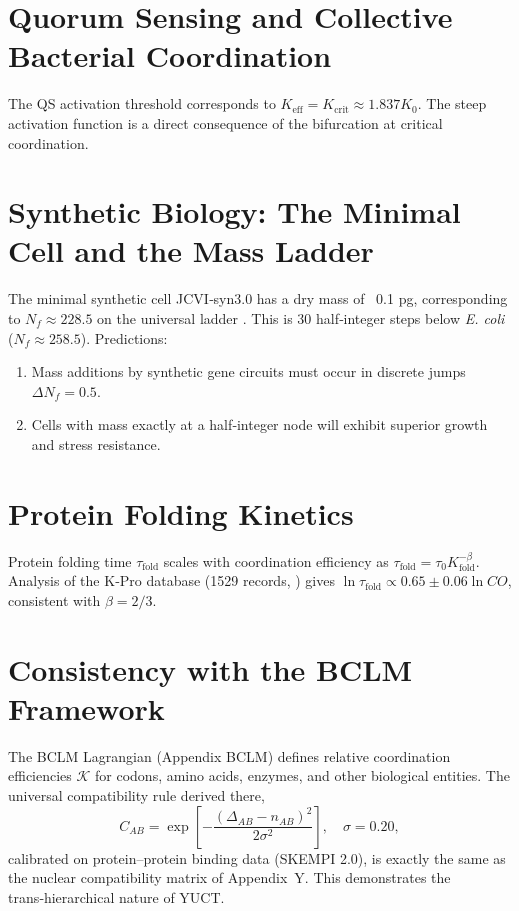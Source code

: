 \documentclass[11pt,a4paper]{article}
\newcommand{\REL}{\mathcal{K}}
\begin{document}
	\section{Quorum Sensing and Collective Bacterial Coordination}
	
	The QS activation threshold corresponds to \(K_{\text{eff}} = K_{\mathrm{crit}} \approx 1.837 K_0\). The steep activation function is a direct consequence of the bifurcation at critical coordination.
	
	\section{Synthetic Biology: The Minimal Cell and the Mass Ladder}
	
	The minimal synthetic cell JCVI‑syn3.0 has a dry mass of ~0.1 pg, corresponding to \(N_f \approx 228.5\) on the universal ladder \cite{Hutchison2016, Pelletier2023}. This is 30 half‑integer steps below \textit{E. coli} (\(N_f \approx 258.5\)). Predictions:
	\begin{enumerate}
		\item Mass additions by synthetic gene circuits must occur in discrete jumps \(\Delta N_f = 0.5\).
		\item Cells with mass exactly at a half‑integer node will exhibit superior growth and stress resistance.
	\end{enumerate}
	
	\section{Protein Folding Kinetics}
	
	Protein folding time \(\tau_{\text{fold}}\) scales with coordination efficiency as \(\tau_{\text{fold}} = \tau_0 K_{\text{fold}}^{-\beta}\). Analysis of the K‑Pro database (1529 records, \cite{Turina2023}) gives \(\ln \tau_{\text{fold}} \propto 0.65 \pm 0.06 \ln CO\), consistent with \(\beta=2/3\).
	
	\section{Consistency with the BCLM Framework}
	
	The BCLM Lagrangian (Appendix BCLM) defines relative coordination efficiencies \(\REL\) for codons, amino acids, enzymes, and other biological entities. The universal compatibility rule derived there,
	\[
	C_{AB} = \exp\!\left[-\frac{(\Delta_{AB}-n_{AB})^2}{2\sigma^2}\right],\quad \sigma=0.20,
	\]
	calibrated on protein–protein binding data (SKEMPI 2.0), is exactly the same as the nuclear compatibility matrix of Appendix~Y. This demonstrates the trans‑hierarchical nature of YUCT.
	
\end{document}
